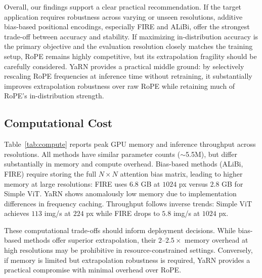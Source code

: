 Overall, our findings support a clear practical recommendation. If the target application requires
robustness across varying or unseen resolutions, additive bias-based positional encodings, especially
FIRE and ALiBi, offer the strongest trade-off between accuracy and stability. If maximizing
in-distribution accuracy is the primary objective and the evaluation resolution closely matches the
training setup, RoPE remains highly competitive, but its extrapolation fragility should be
carefully considered. YaRN provides a practical middle ground: by selectively rescaling RoPE
frequencies at inference time without retraining, it substantially improves extrapolation
robustness over raw RoPE while retaining much of RoPE's in-distribution strength.

\subsection{Computational Cost}

Table~\ref{tab:compute} reports peak GPU memory and inference throughput across resolutions. All methods have similar parameter counts ($\sim$5.5M), but differ substantially in memory and compute overhead. Bias-based methods (ALiBi, FIRE) require storing the full $N \times N$ attention bias matrix, leading to higher memory at large resolutions: FIRE uses $6.8$ GB at $1024$ px versus $2.8$ GB for Simple ViT. YaRN shows anomalously low memory due to implementation differences in frequency caching. Throughput follows inverse trends: Simple ViT achieves $113$ img/s at $224$ px while FIRE drops to $5.8$ img/s at $1024$ px.

These computational trade-offs should inform deployment decisions. While bias-based methods offer superior extrapolation, their $2$--$2.5\times$ memory overhead at high resolutions may be prohibitive in resource-constrained settings. Conversely, if memory is limited but extrapolation robustness is required, YaRN provides a practical compromise with minimal overhead over RoPE.

